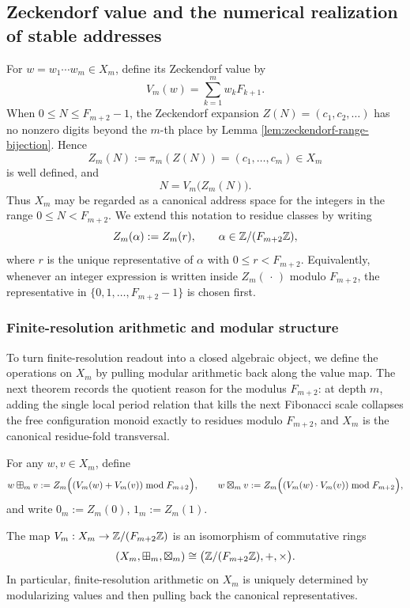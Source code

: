 \subsection{Zeckendorf value and the numerical realization of stable addresses}\label{subsec:emergent-arithmetic-zeckendorf-value-address}

For \(w=w_1\cdots w_m\in X_m\), define its Zeckendorf value by
\[
V_m(w)=\sum_{k=1}^m w_k F_{k+1}.
\]
When \(0\le N\le F_{m+2}-1\), the Zeckendorf expansion \(Z(N)=(c_1,c_2,\dots)\) has no nonzero digits beyond the \(m\)-th place by Lemma \ref{lem:zeckendorf-range-bijection}. Hence
\[
Z_m(N):=\pi_m(Z(N))=(c_1,\dots,c_m)\in X_m
\]
is well defined, and
\[
N=V_m\bigl(Z_m(N)\bigr).
\]
Thus \(X_m\) may be regarded as a canonical address space for the integers in the range \(0\le N<F_{m+2}\). We extend this notation to residue classes by writing
\[
Z_m(\alpha):=Z_m(r),\qquad \alpha\in\mathbb{Z}/(F_{m+2}\mathbb{Z}),
\]
where \(r\) is the unique representative of \(\alpha\) with \(0\le r<F_{m+2}\). Equivalently, whenever an integer expression is written inside \(Z_m(\,\cdot\,)\) modulo \(F_{m+2}\), the representative in \(\{0,1,\dots,F_{m+2}-1\}\) is chosen first.

\subsubsection{Finite-resolution arithmetic and modular structure}
To turn finite-resolution readout into a closed algebraic object, we define the operations on \(X_m\) by pulling modular arithmetic back along the value map. The next theorem records the quotient reason for the modulus \(F_{m+2}\): at depth \(m\), adding the single local period relation that kills the next Fibonacci scale collapses the free configuration monoid exactly to residues modulo \(F_{m+2}\), and \(X_m\) is the canonical residue-fold transversal.

\begin{definition}\label{def:finite-resolution-arithmetic}
For any \(w,v\in X_m\), define
\[
w\boxplus_m v:=Z_m\Bigl((V_m(w)+V_m(v))\bmod F_{m+2}\Bigr),
\qquad
w\boxtimes_m v:=Z_m\Bigl((V_m(w)\cdot V_m(v))\bmod F_{m+2}\Bigr),
\]
and write \(0_m:=Z_m(0)\), \(1_m:=Z_m(1)\).
\end{definition}

\begin{theorem}
\label{thm:finite-resolution-mod}
The map \(V_m:X_m\to\mathbb{Z}/(F_{m+2}\mathbb{Z})\) is an isomorphism of commutative rings
\[
(X_m,\boxplus_m,\boxtimes_m)\cong\bigl(\mathbb{Z}/(F_{m+2}\mathbb{Z}),+,\times\bigr).
\]
In particular, finite-resolution arithmetic on \(X_m\) is uniquely determined by modularizing values and then pulling back the canonical representatives.
\end{theorem}

